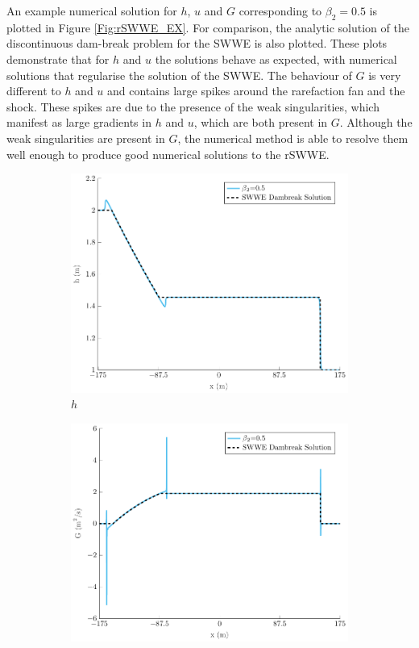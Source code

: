 \documentclass[10pt]{elsarticle}
\begin{document}
An example numerical solution for $h$, $u$ and $G$ corresponding to $\beta_2 = 0.5$ is plotted in Figure \ref{Fig:rSWWE_EX}. For comparison, the analytic solution of the discontinuous dam-break problem for the SWWE is also plotted. These plots demonstrate that for $h$ and $u$ the solutions behave as expected, with numerical solutions that regularise the solution of the SWWE. The behaviour of $G$ is very different to $h$ and $u$ and contains large spikes around the rarefaction fan and the shock. These spikes are due to the presence of the weak singularities, which manifest as large gradients in $h$ and $u$, which are both present in $G$. Although the weak singularities are present in $G$, the numerical method is able to resolve them well enough to produce good numerical solutions to the rSWWE. 
%
\begin{figure}
	\centering
	\begin{subfigure}{0.32\textwidth}
		\centering
		\includegraphics[width=\textwidth]{./Figures/Simulations/Study/RegSWWE/Convergence/h.pdf}
		\caption{$h$}
		\label{Fig:rSWWE_EX_h}
	\end{subfigure}
	\begin{subfigure}{0.32\textwidth}
		\centering
		\includegraphics[width=\textwidth]{./Figures/Simulations/Study/RegSWWE/Convergence/G.pdf}

\end{subfigure}
\end{figure}
\end{document}
